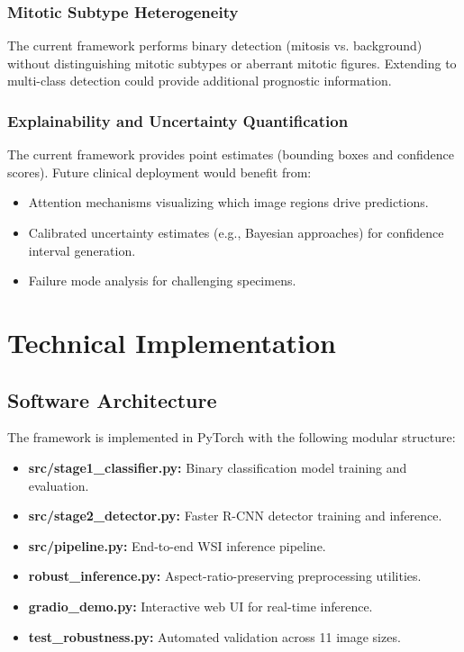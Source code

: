 \documentclass[journal]{IEEEtran}
\begin{document}
\subsubsection{Mitotic Subtype Heterogeneity}
The current framework performs binary detection (mitosis vs. background) without distinguishing mitotic subtypes or aberrant mitotic figures. Extending to multi-class detection could provide additional prognostic information.

\subsubsection{Explainability and Uncertainty Quantification}
The current framework provides point estimates (bounding boxes and confidence scores). Future clinical deployment would benefit from:
\begin{itemize}
\item Attention mechanisms visualizing which image regions drive predictions.
\item Calibrated uncertainty estimates (e.g., Bayesian approaches) for confidence interval generation.
\item Failure mode analysis for challenging specimens.
\end{itemize}

\section{Technical Implementation}

\subsection{Software Architecture}
The framework is implemented in PyTorch with the following modular structure:

\begin{itemize}
\item \textbf{src/stage1\_classifier.py:} Binary classification model training and evaluation.
\item \textbf{src/stage2\_detector.py:} Faster R-CNN detector training and inference.
\item \textbf{src/pipeline.py:} End-to-end WSI inference pipeline.
\item \textbf{robust\_inference.py:} Aspect-ratio-preserving preprocessing utilities.
\item \textbf{gradio\_demo.py:} Interactive web UI for real-time inference.
\item \textbf{test\_robustness.py:} Automated validation across 11 image sizes.
\end{itemize}
\end{document}
